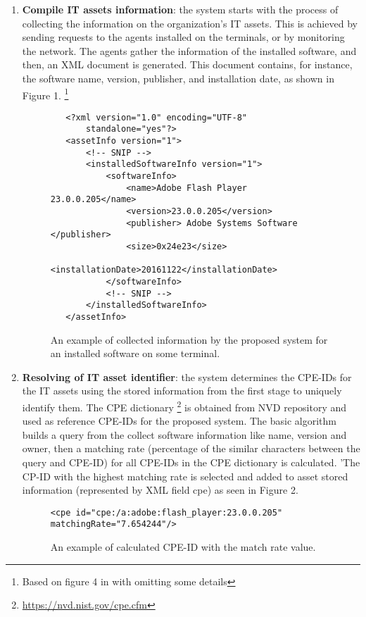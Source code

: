 \documentclass{llncs}
\begin{document}
\begin{enumerate}
 \item \textbf{Compile IT assets information}: the system starts with the process of collecting the information on the organization's IT assets. This is achieved by sending requests to the agents installed on the terminals, or by monitoring the network. The agents gather the information of the installed software, and then, an XML document is generated. This document contains, for instance, the software name, version, publisher, and installation date, as shown in Figure 1.  \footnote{Based on figure 4 in \cite{paper1} with omitting some details} 

 \begin{figure}
 \centering
   \lstset{language=XML}
    \begin{lstlisting}
   <?xml version="1.0" encoding="UTF-8"
       standalone="yes"?>
   <assetInfo version="1">
       <!-- SNIP -->
       <installedSoftwareInfo version="1">
           <softwareInfo>
               <name>Adobe Flash Player 23.0.0.205</name>
               <version>23.0.0.205</version>
               <publisher> Adobe Systems Software </publisher>
               <size>0x24e23</size>
               <installationDate>20161122</installationDate>
           </softwareInfo>
           <!-- SNIP -->
       </installedSoftwareInfo>
   </assetInfo>
    \end{lstlisting}
   \caption{An example of collected information by the proposed system for an installed software on some terminal.}
    \end{figure}
   
   
   \item \textbf{Resolving of IT asset identifier}: the system determines the CPE-IDs for the IT assets using the stored information from the first stage to uniquely identify them. The CPE dictionary \footnote{\url{https://nvd.nist.gov/cpe.cfm}} is obtained from NVD repository and used as reference CPE-IDs for the proposed system. The basic algorithm builds a query from the collect software information like name, version and owner, then a matching rate (percentage of the similar characters between the query and CPE-ID) for all CPE-IDs in the CPE dictionary is calculated. '\newpage The CP-ID with the highest matching rate is selected and added to asset stored information (represented by XML field cpe) as seen in Figure 2.
   
    \begin{figure}
    \centering
      \lstset{language=XML}
       \begin{lstlisting}
<cpe id="cpe:/a:adobe:flash_player:23.0.0.205"   matchingRate="7.654244"/>
       \end{lstlisting}
      \caption{An example of calculated CPE-ID with the match rate value.}
       \end{figure}
      

\end{enumerate}
\end{document}
